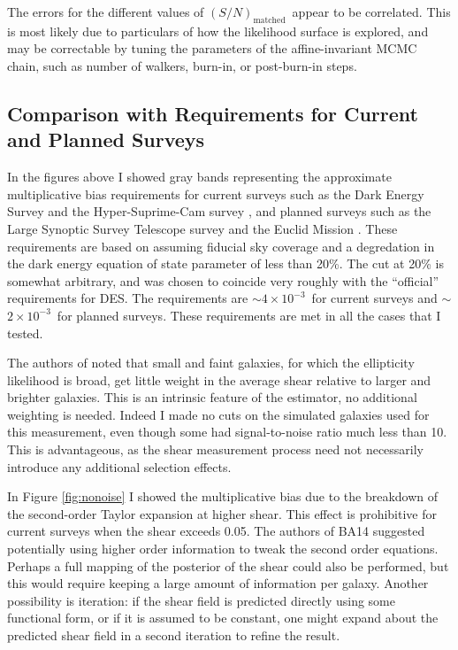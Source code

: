 \documentclass[12pt,preprint]{aastex}
\newcommand{\Msn}{$(S/N)_{\textrm{matched}}$}
\newcommand{\desreq}{$4\times 10^{-3}$}
\newcommand{\lsstreq}{$2\times 10^{-3}$}
\begin{document}
The errors for the different values of \Msn\ appear to be correlated.  This is
most likely due to particulars of how the likelihood surface is explored,
and may be correctable by tuning the parameters of the affine-invariant
MCMC chain, such as number of walkers, burn-in, or post-burn-in steps.

\subsection{Comparison with Requirements for Current and Planned Surveys}
\label{sec:req}

In the figures above I showed gray bands representing the approximate
multiplicative bias requirements for current surveys such as the Dark Energy
Survey \citep[][DES]{DESWhitePaper} and the Hyper-Suprime-Cam survey
\citep[][HSC]{HSC12}, and planned surveys such as the Large Synoptic Survey
Telescope survey \citep[][LSST]{IvezicLSST08} and the Euclid Mission
\citep{Euclid2011}.  These requirements are based on
\citep{HutererSystematics06} assuming fiducial sky coverage and a degredation
in the dark energy equation of state parameter of less than 20\%.  The cut at
20\% is somewhat arbitrary, and was chosen to coincide very roughly with the
``official'' requirements for DES. The requirements are $\sim$\desreq\ for
current surveys and $\sim$\lsstreq\ for planned surveys.  These requirements
are met in all the cases that I tested.

The authors of \cite{ba14} noted that small and faint galaxies, for which the
ellipticity likelihood is broad, get little weight in the average shear
relative to larger and brighter galaxies.  This is an intrinsic feature of the
estimator, no additional weighting is needed.  Indeed I made no cuts on the
simulated galaxies used for this measurement, even though some had
signal-to-noise ratio much less than 10.  This is advantageous, as the shear
measurement process need  not necessarily introduce any additional selection
effects.

In Figure \ref{fig:nonoise} I showed the multiplicative bias due to the
breakdown of the second-order Taylor expansion at higher shear.   This effect
is prohibitive for current surveys when the shear exceeds 0.05.  The authors of
BA14 suggested potentially using higher order information to tweak the second
order equations.  Perhaps a full mapping of the posterior of the shear could
also be performed, but this would require keeping a large amount of information
per galaxy.  Another possibility is iteration: if the shear field is predicted
directly using some functional form, or if it is assumed to be constant, one
might expand about the predicted shear field in a second iteration to refine
the result.
\end{document}
